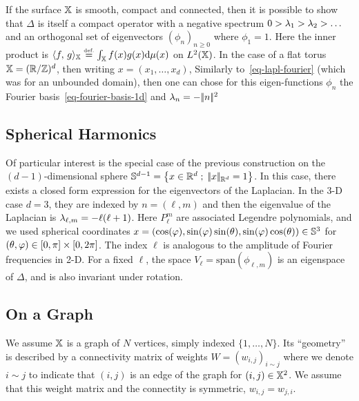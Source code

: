 If the surface $\mathbb{X}$ is smooth, compact and connected, then it is possible to show that $\Delta$ is itself a compact operator with a negative spectrum $0 > \lambda_1 > \lambda_2 > \ldots$ and an orthogonal set of eigenvectors $(\phi_n)_{n \geq 0}$ where $\phi_1=1$. Here the inner product is $\langle f,\,g\rangle_{\mathbb{X}} \stackrel{\mbox{\upshape\tiny def.}}{=} \int_{\mathbb{X}} f(x)g(x) \mathrm{d}\mu(x)$ on $L^2(\mathbb{X})$. 
%
In the case of a flat torus $\mathbb{X}=(\mathbb{R}/\mathbb{Z})^d$, then writing $x=(x_1,\ldots,x_d)$, 
Similarly to~\eqref{eq-lapl-fourier} (which was for an unbounded domain), then one can chose for this eigen-functions $\phi_n$ the Fourier basis~\eqref{eq-fourier-basis-1d} and $\lambda_n=-|\!| n |\!|^2$

\subsection{Spherical Harmonics}
\label{sec-spherical-harm}

Of particular interest is the special case of the previous construction on the $(d-1)$-dimensional sphere $\mathbb{S}^{d-1} = \left\{ x \in \mathbb{R}^d \;;\; |\!| x |\!|_{\mathbb{R}^d}=1 \right\}$.
% 
In this case, there exists a closed form expression for the eigenvectors of the Laplacian. In the 3-D case $d=3$, they are indexed by $n=(\ell,m)$
and then the eigenvalue of the Laplacian is $\lambda_{\ell,m} = -\ell(\ell+1)$. Here $P_{\ell}^m$ are associated Legendre polynomials, and we used spherical coordinates $x=(\cos(\varphi),\sin(\varphi)\sin(\theta),\sin(\varphi)\cos(\theta)) \in \mathbb{S}^3$ for $(\theta,\varphi) \in [0,\pi] \times [0,2\pi]$.
%
The index $\ell$ is analogous to the amplitude of Fourier frequencies in 2-D. 
%
For a fixed $\ell$, the space $V_\ell = \text{span}( \phi_{\ell,m} )$ is an eigenspace of $\Delta$, and is also invariant under rotation. 
	

\subsection{On a Graph}

We assume $\mathbb{X}$ is a graph of $N$ vertices, simply indexed $\{1,\ldots,N\}$. Its ``geometry'' is described by a connectivity matrix of weights $W=(w_{i,j})_{i \sim j}$ where we denote $i \sim j$ to indicate that $(i,j)$ is an edge of the graph for $(i,j) \in \mathbb{X}^2$. We assume that this weight matrix and the connectity is symmetric, $w_{i,j}=w_{j,i}$. 

